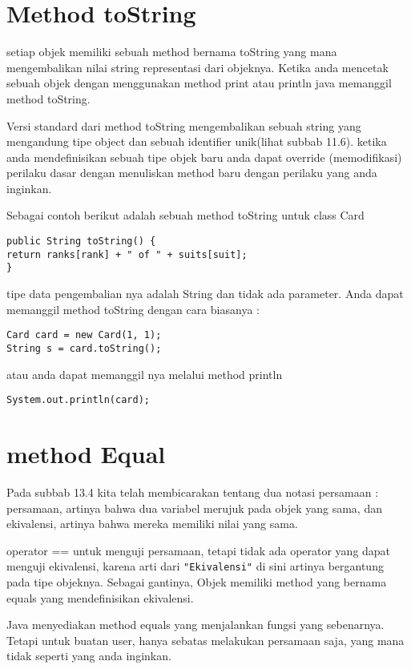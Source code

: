 \section{Method toString} %

setiap objek memiliki sebuah method bernama toString yang mana mengembalikan nilai string representasi dari objeknya. Ketika anda mencetak sebuah objek dengan menggunakan method print atau println java memanggil method toString.

Versi standard dari method toString mengembalikan sebuah string yang mengandung tipe object dan sebuah identifier unik(lihat subbab 11.6). ketika anda mendefinisikan sebuah tipe objek baru anda dapat override (memodifikasi) perilaku dasar dengan menuliskan method baru dengan perilaku yang anda inginkan.

Sebagai contoh berikut adalah sebuah method toString untuk class Card
\begin{lstlisting}
public String toString() {
return ranks[rank] + " of " + suits[suit];
}
\end{lstlisting}

tipe data pengembalian nya adalah String dan tidak ada parameter. Anda dapat memanggil method toString dengan cara biasanya :

\begin{lstlisting}
Card card = new Card(1, 1);
String s = card.toString();
\end{lstlisting}

atau anda dapat memanggil nya melalui method println 
\begin{lstlisting}
System.out.println(card);
\end{lstlisting}

\section{method Equal} %

Pada subbab 13.4 kita telah membicarakan tentang dua notasi persamaan : persamaan, artinya bahwa dua variabel merujuk pada objek yang sama, dan ekivalensi, artinya bahwa mereka memiliki nilai yang sama.

operator == untuk menguji persamaan, tetapi tidak ada operator yang dapat menguji ekivalensi, karena arti dari \texttt{"Ekivalensi"} di sini artinya bergantung pada tipe objeknya. Sebagai gantinya, Objek memiliki method yang bernama equals yang mendefinisikan ekivalensi.

Java menyediakan method equals yang menjalankan fungsi yang sebenarnya. Tetapi untuk buatan user, hanya sebatas melakukan persamaan saja, yang mana tidak seperti yang anda inginkan.

